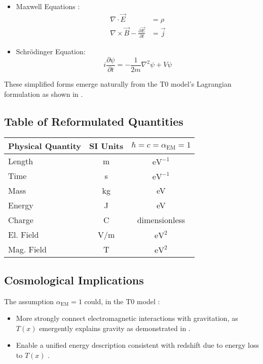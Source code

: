 \documentclass[12pt,a4paper]{article}
\newcommand{\Tfield}{T(x)}
\newcommand{\alphaEM}{\alpha_{\text{EM}}}
\begin{document}
	\begin{itemize}
		\item Maxwell Equations \cite{Feynman1985}:
		\begin{align}
			\nabla \cdot \vec{E} &= \rho \\
			\nabla \times \vec{B} - \frac{\partial \vec{E}}{\partial t} &= \vec{j}
		\end{align}
		\item Schrödinger Equation:
		\begin{equation}
			i \frac{\partial \psi}{\partial t} = -\frac{1}{2m} \nabla^2 \psi + V \psi
		\end{equation}
	\end{itemize}
	
	These simplified forms emerge naturally from the T0 model's Lagrangian formulation as shown in \cite{pascher_lagrange_2025}.
	
	\subsection{Table of Reformulated Quantities}
	\label{subsec:reformulated_quantities}
	
	\begin{center}
		\begin{tabular}{|l|c|c|}
			\hline
			\textbf{Physical Quantity} & \textbf{SI Units} & \textbf{\(\hbar = c = \alphaEM = 1\)} \\
			\hline
			Length & m & \(\text{eV}^{-1}\) \\
			Time & s & \(\text{eV}^{-1}\) \\
			Mass & kg & eV \\
			Energy & J & eV \\
			Charge & C & dimensionless \\
			El. Field & V/m & \(\text{eV}^2\) \\
			Mag. Field & T & \(\text{eV}^2\) \\
			\hline
		\end{tabular}
	\end{center}
	
	\subsection{Cosmological Implications}
	\label{subsec:cosmological_implications}
	
	The assumption \(\alphaEM = 1\) could, in the T0 model \cite{pascher_galaxies_2025}:
	\begin{itemize}
		\item More strongly connect electromagnetic interactions with gravitation, as \(\Tfield\) emergently explains gravity as demonstrated in \cite{pascher_emergente_gravitation_2025}.
		\item Enable a unified energy description consistent with redshift due to energy loss to \(\Tfield\) \cite{pascher_messdifferenzen_2025}.
	\end{itemize}
	
\end{document}
